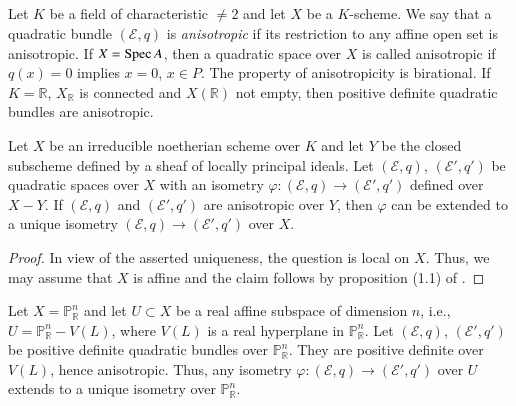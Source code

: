 \subsection{}\label{chap9-sec3.1}

Let $K$ be a field of characteristic $\neq 2$ and let $X$ be a
$K$-scheme. We say that a quadratic bundle $(\mathscr{E},q)$ is {\em
anisotropic} if its restriction to any affine open set is
anisotropic. If $X=\operatorname{Spec} A$, then a quadratic space over $X$ is called
anisotropic if $q(x)=0$ implies $x=0$, $x\in P$. The property of
anisotropicity is birational. If $K=\mathbb{R}$, $X_{\mathbb{R}}$ is
connected and $X(\mathbb{R})$ not empty, then positive definite
quadratic bundles are anisotropic.

\setcounter{subprop}{1}
\begin{subprop}\label{chap9-prop3.2}
Let $X$ be an irreducible noetherian scheme over $K$ and let $Y$ be
the closed subscheme defined by a sheaf of locally principal
ideals. Let $(\mathscr{E},q)$, $(\mathscr{E}',q')$ be quadratic spaces
over $X$ with an isometry $\varphi:(\mathscr{E},q)\to
(\mathscr{E}',q')$ defined over $X-Y$. If $(\mathscr{E},q)$ and
$(\mathscr{E}',q')$ are anisotropic over $Y$, then $\varphi$ can be
extended to a unique isometry $(\mathscr{E},q)\to (\mathscr{E}',q')$
over $X$. 
\end{subprop}

\begin{proof}
In view of the asserted uniqueness, the question is local on
$X$. Thus, we may assume that $X$ is affine and the claim follows by
proposition (1.1) of \cite{chap9-key7}. 
\end{proof}

\begin{subexam}\label{chap9-exam3.3}
Let $X=\mathbb{P}^{n}_{\mathbb{R}}$ and let $U\subset X$ be a real
affine subspace of dimension $n$, i.e.,
$U=\mathbb{P}^{n}_{\mathbb{R}}-V(L)$, where $V(L)$ is a real
hyperplane in $\mathbb{P}^{n}_{\mathbb{R}}$. Let $(\mathscr{E},q)$,
$(\mathscr{E}',q')$ be positive definite quadratic bundles over
$\mathbb{P}^{n}_{\mathbb{R}}$. They are positive definite over $V(L)$,
hence anisotropic. Thus, any isometry $\varphi:(\mathscr{E},q)\to
(\mathscr{E}',q')$ over $U$ extends to a unique isometry over
$\mathbb{P}^{n}_{\mathbb{R}}$. 
\end{subexam}

\setcounter{subsection}{3}
\subsection{}\label{chap9-sec3.4}\pageoriginale

